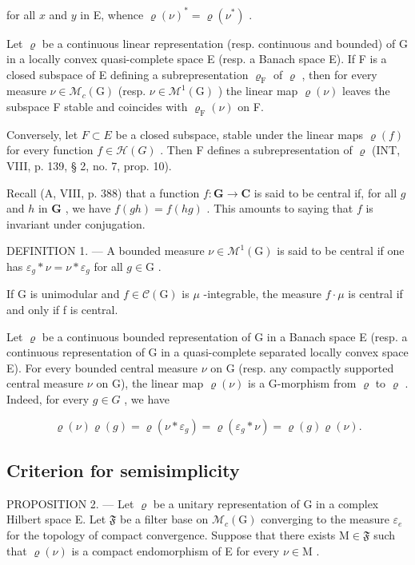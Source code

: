 for all \(x\) and \(y\) in E, whence \(\varrho(\nu)^{*} = \varrho(\nu^{*})\) .

Let \(\varrho\) be a continuous linear representation (resp. continuous and bounded) of G in a locally convex quasi-complete space E (resp. a Banach space E). If F is a closed subspace of E defining a subrepresentation \(\varrho_{\mathrm{F}}\) of \(\varrho\) , then for every measure \(\nu \in \mathcal{M}_c(\mathrm{G})\) (resp. \(\nu \in \mathcal{M}^1 (\mathrm{G})\) ) the linear map \(\varrho (\nu)\) leaves the subspace F stable and coincides with \(\varrho_{\mathrm{F}}(\nu)\) on F.

Conversely, let \(F \subset E\) be a closed subspace, stable under the linear maps \(\varrho(f)\) for every function \(f \in \mathcal{H}(G)\) . Then F defines a subrepresentation of \(\varrho\) (INT, VIII, p. 139, § 2, no. 7, prop. 10).

Recall (A, VIII, p. 388) that a function \(f \colon \mathbf{G} \to \mathbf{C}\) is said to be central if, for all \(g\) and \(h\) in \(\mathbf{G}\) , we have \(f(gh) = f(hg)\) . This amounts to saying that \(f\) is invariant under conjugation.

DEFINITION 1. --- A bounded measure \(\nu \in \mathcal{M}^{1}(\mathrm{G})\) is said to be central if one has \(\varepsilon_{g} * \nu = \nu * \varepsilon_{g}\) for all \(g \in \mathrm{G}\) .

If G is unimodular and \(f \in \mathcal{C}(\mathrm{G})\) is \(\mu\) -integrable, the measure \(f \cdot \mu\) is central if and only if f is central.

Let \(\varrho\) be a continuous bounded representation of G in a Banach space E (resp. a continuous representation of G in a quasi-complete separated locally convex space E). For every bounded central measure \(\nu\) on G (resp. any compactly supported central measure \(\nu\) on G), the linear map \(\varrho(\nu)\) is a G-morphism from \(\varrho\) to \(\varrho\) . Indeed, for every \(g \in G\) , we have

\[
\varrho (\nu) \varrho (g) = \varrho (\nu * \varepsilon_ {g}) = \varrho (\varepsilon_ {g} * \nu) = \varrho (g) \varrho (\nu).
\]

\subsection{Criterion for semisimplicity}

PROPOSITION 2. --- Let \(\varrho\) be a unitary representation of G in a complex Hilbert space E. Let \(\mathfrak{F}\) be a filter base on \(\mathcal{M}_{c}(\mathrm{G})\) converging to the measure \(\varepsilon_{e}\) for the topology of compact convergence. Suppose that there exists \(\mathrm{M} \in \mathfrak{F}\) such that \(\varrho(\nu)\) is a compact endomorphism of E for every \(\nu \in \mathrm{M}\) .

